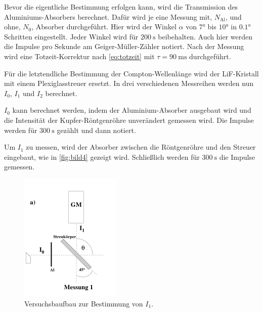 Bevor die eigentliche Bestimmung erfolgen kann, wird die Transmission des Aluminiums-Absorbers berechnet.
Dafür wird je eine Messung mit, $N_\text{Al}$, und ohne, $N_0$, Absorber durchgeführt.
Hier wird der Winkel $\alpha$ von $\ang{7}$ bis $\ang{10}$ in  $\ang{0.1}$ Schritten eingestellt.
Jeder Winkel wird für $\SI{200}{\second}$ beibehalten.
Auch hier werden die Impulse pro Sekunde am Geiger-Müller-Zähler notiert.
Nach der Messung wird eine Totzeit-Korrektur nach \autoref{eq:totzeit} mit $\tau = \SI{90}{\milli\second}$ durchgeführt.

Für die letztendliche Bestimmung der Compton-Wellenlänge wird der LiF-Kristall mit einem Plexiglasstreuer ersetzt.
In drei verschiedenen Messreihen werden nun $I_0$, $I_1$ und $I_2$ berechnet.

$I_0$ kann berechnet werden, indem der Aluminium-Absorber ausgebaut wird und die Intensität der Kupfer-Röntgenröhre unverändert gemessen wird.
Die Impulse werden für $\SI{300}{\second}$ gezählt und dann notiert.

Um $I_1$ zu messen, wird der Absorber zwischen die Röntgenröhre und den Streuer eingebaut, wie in \autoref{fig:bild4} gezeigt wird.
Schließlich werden für $\SI{300}{\second}$ die Impulse gemessen.

\begin{figure}
    \centering
    \includegraphics[width=\textwidth/2]{images/bild4.png}
    \caption{Versuchsbaufbau zur Bestimmung von $I_1$. \cite{V603}}
    \label{fig:bild4}
\end{figure}

